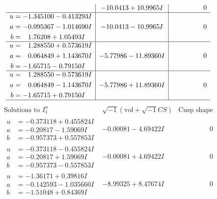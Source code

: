 \documentclass[1p]{elsarticle_modified}
\theoremstyle{definition}
\newcommand{\I}{\sqrt{-1}}
\begin{document}
$$\begin{array}{c|c|c}
 & -10.0413 + 10.9965 I & \phantom{-0.000000 } 0 \\ \hline\begin{aligned}
u &= -1.345100 - 0.413293 I \\
a &= -0.095367 - 1.014690 I \\
b &= \phantom{-}1.76208 + 1.05493 I\end{aligned}
 & -10.0413 - 10.9965 I & \phantom{-0.000000 } 0 \\ \hline\begin{aligned}
u &= \phantom{-}1.288550 + 0.573619 I \\
a &= \phantom{-}0.064849 + 1.143670 I \\
b &= -1.65715 - 0.79150 I\end{aligned}
 & -5.77986 - 11.89360 I & \phantom{-0.000000 } 0 \\ \hline\begin{aligned}
u &= \phantom{-}1.288550 - 0.573619 I \\
a &= \phantom{-}0.064849 - 1.143670 I \\
b &= -1.65715 + 0.79150 I\end{aligned}
 & -5.77986 + 11.89360 I & \phantom{-0.000000 } 0\\
 \hline 
 \end{array}$$\newpage$$\begin{array}{c|c|c}  
\text{Solutions to }I^u_{1}& \I (\text{vol} + \sqrt{-1}CS) & \text{Cusp shape}\\
 \hline 
\begin{aligned}
u &= -0.373118 + 0.455824 I \\
a &= -0.20817 - 1.59069 I \\
b &= -0.957373 + 0.557853 I\end{aligned}
 & -0.00081 - 4.69422 I & \phantom{-0.000000 } 0 \\ \hline\begin{aligned}
u &= -0.373118 - 0.455824 I \\
a &= -0.20817 + 1.59069 I \\
b &= -0.957373 - 0.557853 I\end{aligned}
 & -0.00081 + 4.69422 I & \phantom{-0.000000 } 0 \\ \hline\begin{aligned}
u &= -1.36171 + 0.39816 I \\
a &= -0.142593 - 1.035660 I \\
b &= -1.51048 + 0.84369 I\end{aligned}
 & -8.99325 + 8.47674 I & \phantom{-0.000000 } 0 \\ \hline\begin{aligned}

\end{aligned}
\end{array}$$
\end{document}
